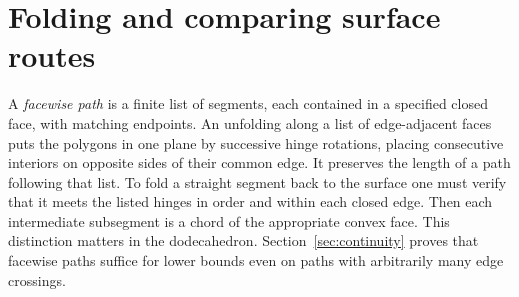 \documentclass[11pt,letterpaper]{article}
\newcommand{\1}{\mathbf 1}
\begin{document}
\section{Folding and comparing surface routes}
A \emph{facewise path} is a finite list of segments, each contained in a specified closed face, with matching endpoints. An unfolding along a list of edge-adjacent faces puts the polygons in one plane by successive hinge rotations, placing consecutive interiors on opposite sides of their common edge. It preserves the length of a path following that list. To fold a straight segment back to the surface one must verify that it meets the listed hinges in order and within each closed edge. Then each intermediate subsegment is a chord of the appropriate convex face. This distinction matters in the dodecahedron. Section~\ref{sec:continuity} proves that facewise paths suffice for lower bounds even on paths with arbitrarily many edge crossings.
\end{document}
